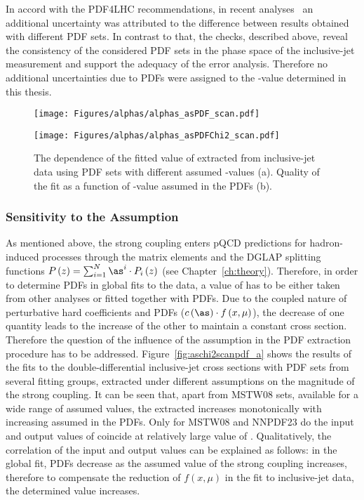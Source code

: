 In accord with the PDF4LHC recommendations, in recent analyses~\cite{thesis:britzger:2013} an additional uncertainty was attributed to the difference between results obtained with different PDF sets. In contrast to that, the checks, described above, reveal the consistency of the considered PDF sets in the phase space of the inclusive-jet measurement and support the adequacy of the  error analysis. Therefore no additional uncertainties due to PDFs were assigned to the \asz-value determined in this thesis. 
\begin{figure}[t]
 \centering
\begin{subfloat}[]{\texttt{[image: Figures/alphas/alphas\_asPDF\_scan.pdf]}
   \label{fig:aschi2scanpdf_a}
 }%
\end{subfloat}
\begin{subfloat}[]{\texttt{[image: Figures/alphas/alphas\_asPDFChi2\_scan.pdf]}
   \label{fig:aschi2scanpdf_b}
 }%
\end{subfloat}
 \caption{The dependence of the fitted value of \asz extracted from inclusive-jet data using PDF sets with different assumed \asz-values (a). Quality of the fit as a function of \asz-value assumed in the PDFs (b).}
 \label{fig:aschi2scanpdf}
\end{figure}
\subsubsection{Sensitivity to the \asz Assumption}
\label{subsec:asassump}
As mentioned above, the strong coupling enters pQCD predictions for hadron-induced processes through the matrix elements and the DGLAP splitting functions $P\left(z\right)=\sum_{i=1}^{N}{\as^i\cdot P_i\left(z\right)}$ (see Chapter~\ref{ch:theory}). Therefore, in order to determine PDFs in global fits to the data, a value of \asz has to be either taken from other analyses or fitted together with PDFs. Due to the coupled nature of perturbative hard coefficients and PDFs ($c\left(\as\right)\cdot f\left(x,\mu\right)$), the decrease of one quantity leads to the increase of the other to maintain a constant cross section. Therefore the question of the influence of the \asz assumption in the PDF extraction procedure has to be addressed. Figure~\ref{fig:aschi2scanpdf_a} shows the results of the \asz fits to the double-differential inclusive-jet cross sections with PDF sets from several fitting groups, extracted under different assumptions on the magnitude of the strong coupling. It can be seen that, apart from MSTW08 sets, available for a wide range of assumed \asz values, the extracted \asz increases monotonically with increasing \asz assumed in the PDFs. Only for MSTW08 and NNPDF23 do the input and output values of \asz coincide at relatively large value of \as. Qualitatively, the correlation of the input and output values can be explained as follows: in the global fit, PDFs decrease as the assumed value of the strong coupling increases, therefore to compensate the reduction of $f\left(x,\mu\right)$ in the fit to inclusive-jet data, the determined \asz value increases.

